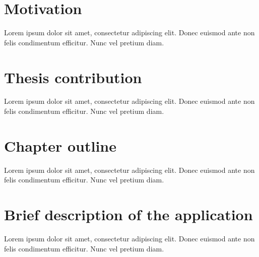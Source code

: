 \setcounter{chapter}{1}

\section{Motivation}
  Lorem ipsum dolor sit amet, consectetur adipiscing elit. Donec euismod ante
  non felis condimentum efficitur. Nunc vel pretium diam.

\section{Thesis contribution}
  Lorem ipsum dolor sit amet, consectetur adipiscing elit. Donec euismod ante
  non felis condimentum efficitur. Nunc vel pretium diam.

\section{Chapter outline}
  Lorem ipsum dolor sit amet, consectetur adipiscing elit. Donec euismod ante
  non felis condimentum efficitur. Nunc vel pretium diam.

\section{Brief description of the application}
  Lorem ipsum dolor sit amet, consectetur adipiscing elit. Donec euismod ante
  non felis condimentum efficitur. Nunc vel pretium diam.
